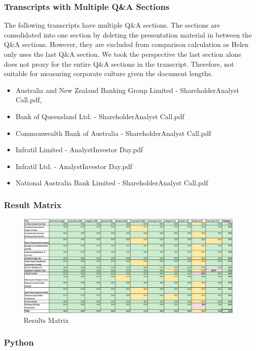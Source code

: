 \documentclass[11pt]{article}
\begin{document}
\subsubsection{Transcripts with Multiple Q\&A Sections} \label{MQA}
The following transcripts have multiple Q\&A sections.
The sections are consolidated into one section by deleting the presentation material in between the Q\&A sections.
However, they are excluded from comparison calculation as Helen only uses the last Q\&A section.
We took the perspective the last section alone does not proxy for the entire Q\&A sections in the transcript. Therefore, not suitable for measuring corporate culture given the document lengths.
\begin{itemize}
    \item Australia and New Zealand Banking Group Limited - ShareholderAnalyst Call.pdf, 
    \item Bank of Queensland Ltd. - ShareholderAnalyst Call.pdf
    \item Commonwealth Bank of Australia - ShareholderAnalyst Call.pdf
    \item Infratil Limited - AnalystInvestor Day.pdf
    \item Infratil Ltd. - AnalystInvestor Day.pdf
    \item National Australia Bank Limited - ShareholderAnalyst Call.pdf
\end{itemize}
\begin{landscape}
\subsubsection{Result Matrix}\label{RM}
\begin{figure}[h]
    \centering
    \includegraphics[width=1.5\textwidth]{RM.png}
    \caption{Results Matrix}
    \label{fig:mesh1}
\end{figure}
\end{landscape}
\subsubsection{Python}\label{code}

\end{document}
